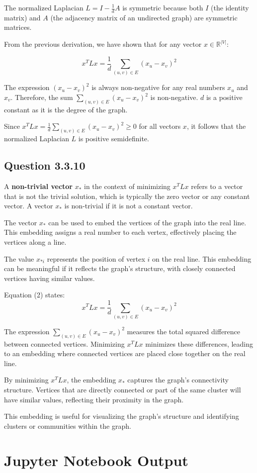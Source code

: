 \documentclass{article}
\begin{document}
The normalized Laplacian \( L = I - \frac{1}{d} A \) is symmetric because both \( I \) (the identity matrix) and \( A \) (the adjacency matrix of an undirected graph) are symmetric matrices.

From the previous derivation, we have shown that for any vector \( x \in \mathbb{R}^{|V|} \):

\[
x^T L x = \frac{1}{d} \sum_{(u,v) \in E} (x_u - x_v)^2
\]

The expression \((x_u - x_v)^2\) is always non-negative for any real numbers \(x_u\) and \(x_v\). Therefore, the sum \(\sum_{(u,v) \in E} (x_u - x_v)^2\) is non-negative. \(d\) is a positive constant as it is the degree of the graph.

Since \( x^T L x = \frac{1}{d} \sum_{(u,v) \in E} (x_u - x_v)^2 \geq 0 \) for all vectors \( x \), it follows that the normalized Laplacian \( L \) is positive semidefinite.

\subsection{Question 3.3.10}

A \textbf{non-trivial vector} \( x_* \) in the context of minimizing \( x^T L x \) refers to a vector that is not the trivial solution, which is typically the zero vector or any constant vector. A vector \( x_* \) is non-trivial if it is not a constant vector.

The vector \( x_* \) can be used to embed the vertices of the graph into the real line. This embedding assigns a real number to each vertex, effectively placing the vertices along a line.

The value \( x_{*i} \) represents the position of vertex \( i \) on the real line. This embedding can be meaningful if it reflects the graph's structure, with closely connected vertices having similar values.

Equation (2) states:
\[
x^T L x = \frac{1}{d} \sum_{(u,v) \in E} (x_u - x_v)^2
\]

The expression \( \sum_{(u,v) \in E} (x_u - x_v)^2 \) measures the total squared difference between connected vertices. Minimizing \( x^T L x \) minimizes these differences, leading to an embedding where connected vertices are placed close together on the real line.

By minimizing \( x^T L x \), the embedding \( x_* \) captures the graph's connectivity structure. Vertices that are directly connected or part of the same cluster will have similar values, reflecting their proximity in the graph.

This embedding is useful for visualizing the graph's structure and identifying clusters or communities within the graph.


\appendix
\section{Jupyter Notebook Output}

\end{document}
